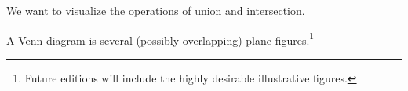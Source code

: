 

We want to visualize the operations of union and intersection.


A Venn diagram is several (possibly overlapping) plane figures.\footnote{Future editions will include the highly desirable illustrative figures.}

\blankpage
